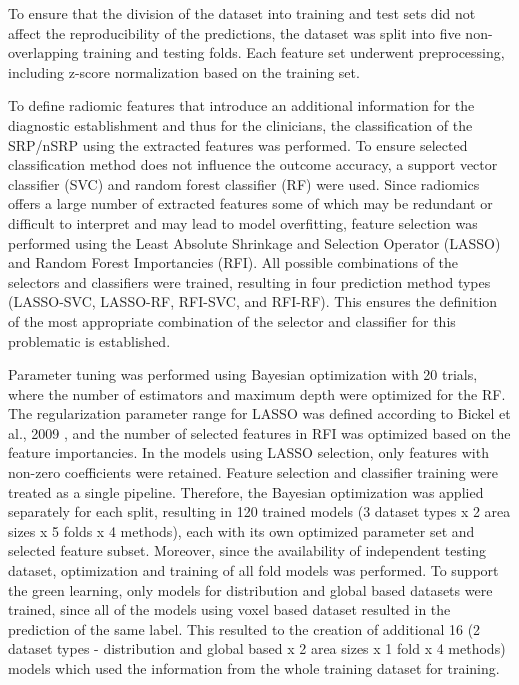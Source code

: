 \documentclass[preprint,12pt]{elsarticle}
\begin{document}
To ensure that the division of the dataset into training and test sets did not affect the reproducibility of the predictions, the dataset was split into five non-overlapping training and testing folds. Each feature set underwent preprocessing, including z-score normalization based on the training set. 

To define radiomic features that introduce an additional information for the diagnostic establishment and thus for the clinicians, the classification of the SRP/nSRP using the extracted features was performed. To ensure selected classification method does not influence the outcome accuracy, a support vector classifier (SVC) and random forest classifier (RF) were used. Since radiomics offers a large number of extracted features some of which may be redundant or difficult to interpret and may lead to model overfitting, feature selection was performed using the Least Absolute Shrinkage and Selection Operator (LASSO) and Random Forest Importancies (RFI). All possible combinations of the selectors and classifiers were trained, resulting in four prediction method types (LASSO-SVC, LASSO-RF, RFI-SVC, and RFI-RF). This ensures the definition of the most appropriate combination of the selector and classifier for this problematic is established. 

Parameter tuning was performed using Bayesian optimization with 20 trials, where the number of estimators and maximum depth were optimized for the RF. The regularization parameter range for LASSO was defined according to Bickel et al., 2009 \cite{Bickel200981}, and the number of selected features in RFI was optimized based on the feature importancies. In the models using LASSO selection, only features with non-zero coefficients were retained. Feature selection and classifier training were treated as a single pipeline. Therefore, the Bayesian optimization was applied separately for each split, resulting in 120 trained models (3 dataset types x 2 area sizes x 5 folds x 4 methods), each with its own optimized parameter set and selected feature subset. Moreover, since the availability of independent testing dataset, optimization and training of all fold models was performed. To support the green learning, only models for distribution and global based datasets were trained, since all of the models using voxel based dataset resulted in the prediction of the same label. This resulted to the creation of additional 16 (2 dataset types - distribution and global based x 2 area sizes x 1 fold x 4 methods) models which used the information from the whole training dataset for training.
\end{document}
